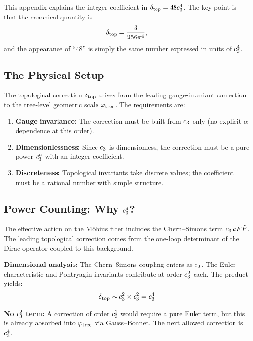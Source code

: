 This appendix explains the integer coefficient in $\delta_{\mathrm{top}} = 48c_3^4$.
The key point is that the canonical quantity is
\begin{equation}
    \delta_{\mathrm{top}} = \frac{3}{256\pi^4},
\end{equation}
and the appearance of ``48'' is simply the same number expressed in units of $c_3^4$.

\subsection{The Physical Setup}

The topological correction $\delta_{\mathrm{top}}$ arises from the leading gauge-invariant correction 
to the tree-level geometric scale $\varphi_{\mathrm{tree}}$. The requirements are:
\begin{enumerate}[leftmargin=1.5em, topsep=2pt, itemsep=1pt]
    \item \textbf{Gauge invariance:} The correction must be built from $c_3$ only 
        (no explicit $\alpha$ dependence at this order).
    \item \textbf{Dimensionlessness:} Since $c_3$ is dimensionless, the correction 
        must be a pure power $c_3^n$ with an integer coefficient.
    \item \textbf{Discreteness:} Topological invariants take discrete values; the 
        coefficient must be a rational number with simple structure.
\end{enumerate}

\subsection{Power Counting: Why $c_3^4$?}

The effective action on the M\"obius fiber includes the Chern--Simons term 
$c_3\, a F\tilde{F}$. The leading topological correction comes from the 
one-loop determinant of the Dirac operator coupled to this background.

\textbf{Dimensional analysis:} The Chern--Simons coupling enters as $c_3$. The 
Euler characteristic and Pontryagin invariants contribute at order $c_3^2$ each. 
The product yields:
\begin{equation}
    \delta_{\mathrm{top}} \sim c_3^2 \times c_3^2 = c_3^4
\end{equation}

\textbf{No $c_3^2$ term:} A correction of order $c_3^2$ would require a 
pure Euler term, but this is already absorbed into $\varphi_{\mathrm{tree}}$ via Gauss--Bonnet. 
The next allowed correction is $c_3^4$.

